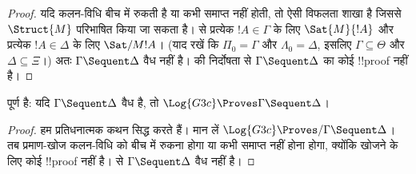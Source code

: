 \documentclass[../../../include/open-logic-section]{subfiles}
\begin{document}
\begin{proof}
  यदि कलन-विधि बीच में रुकती है या कभी समाप्त नहीं होती, तो ऐसी विफलता शाखा
  है जिससे $\Struct{M}$ परिभाषित किया जा सकता है।  से प्रत्येक
  $!A \in \Gamma$ के लिए $\Sat{M}{!A}$ और प्रत्येक $!A \in \Delta$ के लिए
  $\Sat/{M}{!A}$। (याद रखें कि $\Pi_0 = \Gamma$ और $\Lambda_0 = \Delta$,
  इसलिए $\Gamma \subseteq \Theta$ और $\Delta \subseteq \Xi$।) अतः $\Gamma
  \Sequent \Delta$ वैध नहीं है।  की निर्दोषता से $\Gamma \Sequent
  \Delta$ का कोई !!{proof} नहीं है।
\end{proof}

\begin{cor}
 पूर्ण है: यदि $\Gamma \Sequent \Delta$ वैध है, तो $\Log{G3c}
\Proves \Gamma \Sequent \Delta$।
\end{cor}

\begin{proof}
  हम प्रतिधनात्मक कथन सिद्ध करते हैं। मान लें $\Log{G3c} \Proves/ \Gamma
  \Sequent \Delta$। तब प्रमाण-खोज कलन-विधि को बीच में रुकना होगा या कभी समाप्त
  नहीं होना होगा, क्योंकि खोजने के लिए कोई !!{proof} नहीं है।
   से $\Gamma \Sequent \Delta$ वैध नहीं है।
\end{proof}
\end{document}

